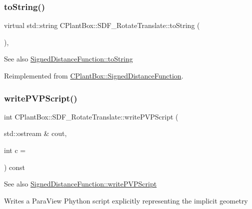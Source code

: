 \subsubsection{\texorpdfstring{to\+String()}{toString()}}
{\footnotesize\ttfamily virtual std\+::string C\+Plant\+Box\+::\+S\+D\+F\+\_\+\+Rotate\+Translate\+::to\+String (\begin{DoxyParamCaption}{ }\end{DoxyParamCaption})\hspace{0.3cm}{\ttfamily [inline]}, {\ttfamily [virtual]}}

\begin{DoxySeeAlso}{See also}
\hyperlink{classCPlantBox_1_1SignedDistanceFunction_a9f375961d9a24b06dc669ac67aa16fa6}{Signed\+Distance\+Function\+::to\+String} 
\end{DoxySeeAlso}


Reimplemented from \hyperlink{classCPlantBox_1_1SignedDistanceFunction_a9f375961d9a24b06dc669ac67aa16fa6}{C\+Plant\+Box\+::\+Signed\+Distance\+Function}.

\mbox{\label{classCPlantBox_1_1SDF__RotateTranslate_ace433edd29e6ff91c9513ca3ccb12f88}} 
\subsubsection{\texorpdfstring{write\+P\+V\+P\+Script()}{writePVPScript()}}
{\footnotesize\ttfamily int C\+Plant\+Box\+::\+S\+D\+F\+\_\+\+Rotate\+Translate\+::write\+P\+V\+P\+Script (\begin{DoxyParamCaption}\item[{std\+::ostream \&}]{cout,  }\item[{int}]{c = {} }\end{DoxyParamCaption}) const\hspace{0.3cm}{\ttfamily [virtual]}}

\begin{DoxySeeAlso}{See also}
\hyperlink{classCPlantBox_1_1SignedDistanceFunction_a0098fb469c9be5557d5593cec9e76d2a}{Signed\+Distance\+Function\+::write\+P\+V\+P\+Script}
\end{DoxySeeAlso}
Writes a Para\+View Phython script explicitly representing the implicit geometry


